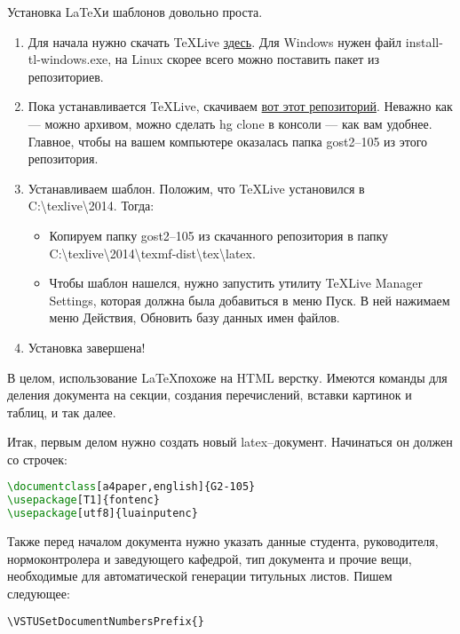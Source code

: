 \documentclass[a4paper,english]{G2-105}
\begin{document}
Установка \LaTeX и шаблонов довольно проста.
\begin{enumerate}
\item Для начала нужно скачать \TeX Live \href{https://www.tug.org/texlive/acquire-netinstall.html}{здесь}. Для Windows нужен файл install-tl-windows.exe, на Linux скорее всего можно поставить пакет из репозиториев.
\item Пока устанавливается \TeX Live, скачиваем \href{https://bitbucket.org/McLeree/latex-sp-vstu}{вот этот репозиторий}. Неважно как --- можно архивом, можно сделать hg clone в консоли --- как вам удобнее. Главное, чтобы на вашем компьютере оказалась папка gost2--105 из этого репозитория.
\item Устанавливаем шаблон. Положим, что \TeX Live установился в C:\textbackslash{}texlive\textbackslash{}2014. Тогда:

\begin{itemize}
\item Копируем папку gost2--105 из скачанного репозитория в папку C:\textbackslash{}texlive\textbackslash{}2014\textbackslash{}texmf-dist\textbackslash{}tex\textbackslash{}latex.
\item Чтобы шаблон нашелся, нужно запустить утилиту \TeX Live Manager Settings, которая должна была добавиться в меню Пуск. В ней нажимаем меню Действия, Обновить базу данных имен файлов.
\end{itemize}
\item Установка завершена!
\end{enumerate}


В целом, использование \LaTeX похоже на HTML верстку. Имеются команды для деления документа на секции, создания перечислений, вставки картинок и таблиц, и так далее.

Итак, первым делом нужно создать новый latex--документ. Начинаться он должен со строчек:
\begin{lstlisting}[language=TeX]
\documentclass[a4paper,english]{G2-105}
\usepackage[T1]{fontenc}
\usepackage[utf8]{luainputenc}
\end{lstlisting}


Также перед началом документа нужно указать данные студента, руководителя, нормоконтролера и заведующего кафедрой, тип документа и прочие вещи, необходимые для автоматической генерации титульных листов. Пишем следующее:

%

\texttt{\scriptsize{}\textbackslash{}VSTUSetDocumentNumbersPrefix\{\}}
\end{document}
